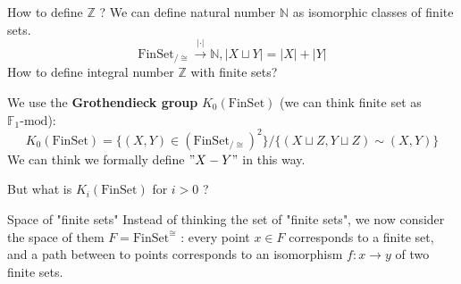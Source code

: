 \documentclass[12pt]{beamer}
\begin{document}
\begin{frame}{How to define $\mathbb{Z}$ ?}
\pause
We can define natural number $\mathbb{N}$ as isomorphic classes of finite sets.
\[
  \mathrm{FinSet}_{/\cong} \xrightarrow{|\cdot|} \mathbb{N}, |X \sqcup Y| = |X|+|Y| 
\]
How to define integral number $\mathbb{Z}$ with finite sets? 

\pause
We use the \textbf{Grothendieck group} $K_0(\mathrm{FinSet})$ (we can think finite set as $\mathbb{F}_1 \text{-}\mathrm{mod}$):
\[
  K_0(\mathrm{FinSet}) = \{ (X,Y)\in (\mathrm{FinSet}_{/\cong})^2   \} / \{ (X \sqcup Z , Y \sqcup Z) \sim (X,Y)\}
\]
We can think we formally define $"X-Y"$ in this way.

\pause
But what is $K_i(\mathrm{FinSet})$ for $i>0$ ?
\end{frame}
\begin{frame}{Space of "finite sets"}
  Instead of thinking the set of "finite sets", we now consider the space of them $F = \mathrm{FinSet}^{\cong}$ : every point $x\in F$ corresponds to a finite set, and a path between to points corresponds to an isomorphism $f:x\to y$ of two finite sets. 
  \pause

\begin{center}


\begin{tikzpicture}[x=0.75pt,y=0.75pt,yscale=-1,xscale=1]


\end{tikzpicture}
\end{center}
\end{frame}
\end{document}
